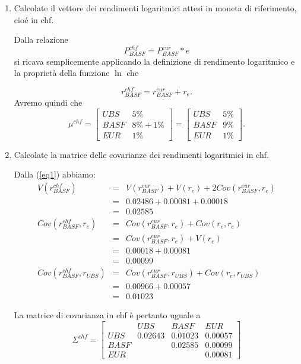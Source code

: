 \documentclass[a4paper,12pt]{article}
\begin{document}
\begin{enumerate}
\begin{enumerate}
\item  Calcolate il vettore dei rendimenti logaritmici attesi in moneta di
riferimento, cio\'{e} in chf.

Dalla relazione 
\[
P_{BASF}^{chf}=P_{BASF}^{eur}\ast e
\]
si ricava semplicemente applicando la definizione di rendimento logaritmico
e la propriet\`{a} della funzione $\ln $ che

\begin{equation}
r_{BASF}^{chf}=r_{BASF}^{eur}+r_e.  \label{eq1}
\end{equation}
Avremo quindi che 
\[
\mu ^{chf}=\left[ 
\begin{array}{cc}
UBS & 5\% \\ 
BASF & 8\%+1\% \\ 
EUR & 1\%
\end{array}
\right] =\left[ 
\begin{array}{cc}
UBS & 5\% \\ 
BASF & 9\% \\ 
EUR & 1\%
\end{array}
\right] .
\]

\item  Calcolate la matrice delle covarianze dei rendimenti logaritmici in
chf.

Dalla (\ref{eq1}) abbiamo:
\begin{eqnarray*}
V(r_{BASF}^{chf}) &=&V(r_{BASF}^{eur})+V(r_e)+2Cov(r_{BASF}^{eur},r_e) \\
&=&0.02486+0.00081+0.00018  \nonumber \\
&=&0.02585  \nonumber \\
Cov(r_{BASF}^{chf},r_e) &=&Cov(r_{BASF}^{eur},r_e)+Cov(r_e,r_e)  \nonumber \\
&=&Cov(r_{BASF}^{eur},r_e)+V(r_e) \\
&=&0.00018+0.00081  \nonumber \\
&=&0.00099  \nonumber \\
Cov(r_{BASF}^{chf},r_{UBS}) &=&Cov(r_{BASF}^{eur},r_{UBS})+Cov(r_e,r_{UBS}) \\
&=&0.00966+0.00057  \nonumber \\
&=&0.01023  \nonumber
\end{eqnarray*}

La matrice di covarianza in chf \`{e} pertanto uguale a
\[
\Sigma ^{chf}=\left[ 
\begin{array}{cccc}
& UBS & BASF & EUR \\ 
UBS & 0.02643 & 0.01023 & 0.00057 \\ 
BASF &  & 0.02585 & 0.00099 \\ 
EUR &  &  & 0.00081
\end{array}
\right] 
\]


\end{enumerate}
\end{enumerate}
\end{document}

